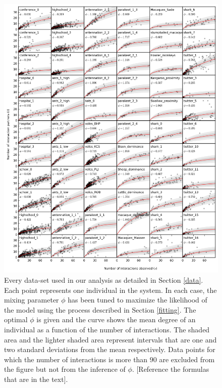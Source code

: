 \documentclass[10pt]{article}
\begin{document}
\begin{multicols}{2}

\begin{figure}[t]
	\centering
	\includegraphics[width=\textwidth]{Figures/Degree_vs_int.png}
   	\caption{Every data-set used in our analysis as detailed in Section \ref{data}. Each point represents one individual in the system. In each case, the mixing parameter $\phi$ has been tuned to maximize the likelihood of the model using the process described in Section \ref{fitting}. The optimal $\phi$ is given and the curve shows the mean degree of an individual as a function of the number of interactions. The shaded area and the lighter shaded area represent intervals that are one and two standard deviations from the mean respectively. Data points for which the number of interactions is more than $90$ are excluded from the figure but not from the inference of $\phi$. [Reference the formulas that are in the text].}
\label{Degree_vs_int}
\end{figure}


\end{multicols}
\end{document}
